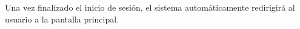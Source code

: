 \begin{RFGestionUsuarios}
\begin{RFGestionUsuarios}
      \item Una vez finalizado el inicio de sesión, el sistema automáticamente redirigirá al usuario a la pantalla principal.
    \end{RFGestionUsuarios}
\end{RFGestionUsuarios}